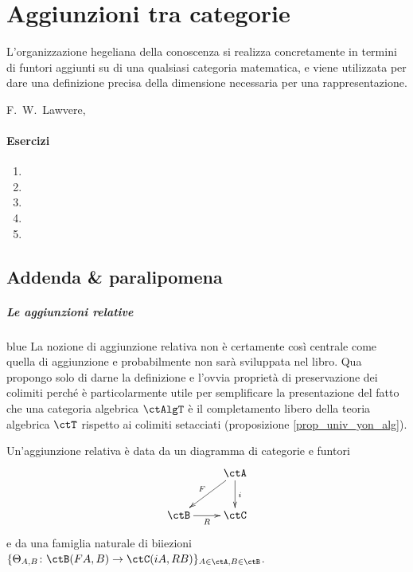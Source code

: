 \chapter{Aggiunzioni tra categorie}\label{cap_aggiunti}
\epigraph{L'organizzazione hegeliana della conoscenza si realizza concretamente in termini di funtori aggiunti su di una qualsiasi categoria matematica, e viene utilizzata
 per dare una definizione precisa della dimensione necessaria per una rappresentazione.}{F.\ W.\ Lawvere, \cite{Lawvere1989Taco}}
\subsubsection*{Esercizi}
\begin{enumerate}
 \item
 \item
 \item
 \item
 \item
\end{enumerate}

\section{Addenda \& paralipomena}\color{gray}
\paragraph{Le aggiunzioni relative}\label{sec_agg_rel}

\begin{color}{blue}
 La nozione di aggiunzione relativa non è certamente così centrale come quella di aggiunzione e probabilmente
 non sarà sviluppata nel libro. Qua propongo solo di darne la definizione e l'ovvia proprietà di preservazione dei
 colimiti perché è particolarmente utile per semplificare la presentazione del fatto che una categoria algebrica
 \(\ctAlgT\) è il completamento libero della teoria algebrica \(\ctT\) rispetto ai colimiti setacciati (proposizione
 \ref{prop_univ_yon_alg}).
\end{color}

\begin{definition}\label{def_agg_rel}
 Un'aggiunzione relativa è data da un diagramma di categorie e funtori
 \[ \xymatrix{ & \ctA \ar[d]^{i} \ar[ld]_{F} \\
  \ctB \ar[r]_-{R} & \ctC } \]
 e da una famiglia naturale di biiezioni
 \( \{\Theta_{A,B} \colon \ctB(FA,B) \to \ctC(iA,RB)\}_{A \in \ctA, B \in \ctB} \).
\end{definition}

